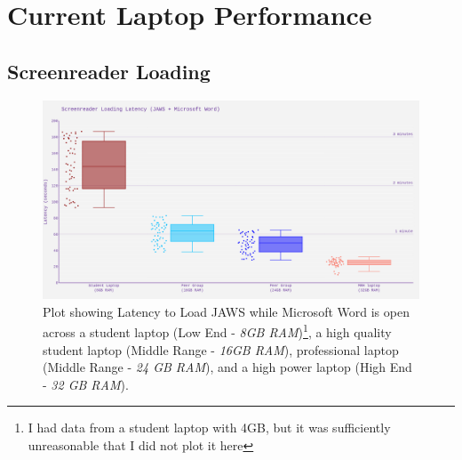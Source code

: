 \documentclass[14pt, letterpaper,twoside]{extreport}
\begin{document}
\pagebreak \hypertarget{current-laptop-performance-measured}{%
	\section*{Current Laptop Performance}\label{current-laptop-performance-measured}}

\hypertarget{screenreader-loading}{%
	\subsection*{Screenreader Loading}\label{screenreader-loading}}
\begin{figure}[!h]
	\centering
	\includegraphics[width=\textwidth]{images/ComputerRBDisplaySpecsTVIFig1.png}
	\caption[Latency to Load JAWS]{Plot showing Latency to Load JAWS while Microsoft Word is open across a student laptop (Low End - \textit{8GB RAM})\footnote{I had data from a student laptop with 4GB, but it was sufficiently unreasonable that I did not plot it here}, a high quality student laptop (Middle Range - \textit{16GB RAM}), professional laptop (Middle Range - \textit{24 GB RAM}), and a high power laptop (High End - \textit{32 GB RAM}). }
	\label{fig:figure 1}
\end{figure}
\end{document}
